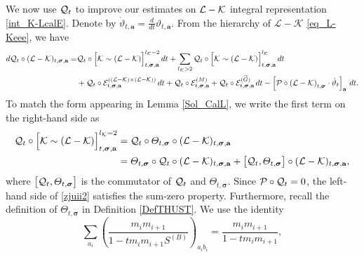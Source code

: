 \documentclass[10pt,reqno]{article}
\theoremstyle{plain} %
\theoremstyle{remark}
\numberwithin{equation}{section}
\begin{document}
We  now use  ${\cal Q}_t$ to improve our estimates on  ${\cal L} - {\cal K}$ integral representation \eqref{int_K-LcalE}.
Denote by $\dot \vartheta_{t,  \textbf{a}}=\frac{d}{dt}\vartheta_{t,  \textbf{a}}$. 
 From the hierarchy of \(\mathcal{L} - \mathcal{K}\) \eqref{eq_L-Keee}, we have 
\begin{align} \label{zjuii1}
    d{\cal Q}_t \circ (\mathcal{L} - \mathcal{K})_{t, \boldsymbol{\sigma}, \textbf{a}} 
    = & {\cal Q}_t \circ \Big[\mathcal{K} \sim (\mathcal{L} - \mathcal{K})\Big]^{l_\mathcal{K} = 2}_{t, \boldsymbol{\sigma}, \textbf{a}} \,dt
    + \sum_{l_\mathcal{K} > 2} {\cal Q}_t \circ \Big[\mathcal{K} \sim (\mathcal{L} - \mathcal{K})\Big]^{l_\mathcal{K}}_{t, \boldsymbol{\sigma}, \textbf{a}} \,dt
    \\\nonumber
    & + {\cal Q}_t \circ \mathcal{E}^{((\mathcal{L} - \mathcal{K}) \times (\mathcal{L} - \mathcal{K}))}_{t, \boldsymbol{\sigma}, \textbf{a}} \,dt
    + {\cal Q}_t \circ \mathcal{E}^{(M)}_{t, \boldsymbol{\sigma}, \textbf{a}} 
    + {\cal Q}_t \circ \mathcal{E}^{(\widetilde{G})}_{t, \boldsymbol{\sigma}, \textbf{a}}\,dt 
    -\left[{\cal P} \circ \left(\mathcal{L} - \mathcal{K}\right)_{t, \boldsymbol{\sigma}} \cdot \dot \vartheta_t \right]_{\textbf{a}}\,dt.
\end{align} 
To  match the form appearing in Lemma \ref{Sol_CalL}, we write the first term on the right-hand side as 
\begin{align}\label{zjuii2}
{\cal Q}_t \circ \Big[\mathcal{K} \sim (\mathcal{L} - \mathcal{K})\Big]^{l_\mathcal{K} = 2}_{t, \boldsymbol{\sigma}, \textbf{a}}
& = {\cal Q}_t \circ \varTheta_{t, \boldsymbol{\sigma}} \circ (\mathcal{L} - \mathcal{K})_{t, \boldsymbol{\sigma}, \textbf{a}}
\\\nonumber
& = \varTheta_{t, \boldsymbol{\sigma}} \circ {\cal Q}_t \circ (\mathcal{L} - \mathcal{K})_{t, \boldsymbol{\sigma}, \textbf{a}}
+ \big[{\cal Q}_t , \varTheta_{t, \boldsymbol{\sigma}} \big] \circ (\mathcal{L} - \mathcal{K})_{t, \boldsymbol{\sigma}, \textbf{a}},
\end{align}
where  $\big[{\cal Q}_t , \varTheta_{t, \boldsymbol{\sigma}} \big] $ is the commutator
of ${\cal Q}_t $ and $\varTheta_{t, \boldsymbol{\sigma}}$.
Since \({\cal P} \circ {\cal Q}_t = 0\), the left-hand side of \eqref{zjuii2} satisfies the sum-zero property. Furthermore, recall the definition of \(\varTheta_{t,\boldsymbol{\sigma}}\) in
Definition \ref{DefTHUST}. We use the identity
\[
\sum_{a_i}
\left(
\frac{m_i m_{i+1}}{1-tm_i m_{i+1}S^{(B)}}
\right)_{a_i b_i}
=
\frac{m_i m_{i+1}}{1-tm_i m_{i+1}},
\]
\end{document}
